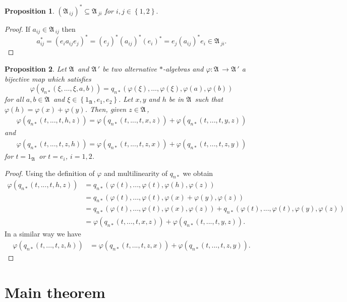 \documentclass{amsart}
\newtheorem{proposition}{Proposition}[section]
\def\A{{\mathfrak A}\, }
\begin{document}
\begin{proposition}\label{obs}
$(\A_{ij})^* \subseteq \A_{ji}$ for $i,j \in \left\{1,2\right\}.$
\end{proposition}
\begin{proof}
If $a_{ij} \in \A_{ij}$ then $$a^*_{ij} = (e_i a_{ij} e_j)^* = (e_j)^*(a_{ij})^* (e_i)^* = e_j (a_{ij})^* e_i \in \A_{ji}.$$
\end{proof}
\begin{proposition}\label{Claim2} Let $\A$ and $\A'$ be two alternative $*$-algebras and $\varphi: \A \rightarrow \A'$ a bijective map which satisfies
\[
\varphi(q_{n*}(\xi, \ldots,\xi, a,b)) = q_{n*}(\varphi(\xi),\ldots,\varphi(\xi),\varphi(a),\varphi(b))
\]
for all $a, b \in \A$ and $\xi \in \left\{1_{\A}, e_1, e_2\right\}$. Let $x,y$ and $h$ be in $\A$ such that $\varphi(h) = \varphi(x) + \varphi(y)$. Then,
 given $z \in \A$,
$$
\begin{aligned}
\varphi(q_{n*}(t,...,t,h,z)) = \varphi(q_{n*}(t,...,t,x,z)) + \varphi(q_{n*}(t,...,t,y,z))
\end{aligned}
$$
and
$$
\begin{aligned}
\varphi(q_{n*}(t,...,t,z,h)) = \varphi(q_{n*}(t,...,t,z,x)) + \varphi(q_{n*}(t,...,t,z,y))
\end{aligned}
$$
for $t = 1_\A$ or $t = e_i$, $i = 1,2$.

\end{proposition}

\begin{proof}
Using the definition of $\varphi$ and multilinearity of $q_{n*}$ we obtain
$$
\begin{aligned}
\varphi(q_{n*}(t,...,t,h,z)) &= q_{n*}(\varphi(t),...,\varphi(t),\varphi(h),\varphi(z)) \\
&= q_{n*}(\varphi(t),...,\varphi(t),\varphi(x)+\varphi(y),\varphi(z)) \\
&= q_{n*}(\varphi(t),...,\varphi(t),\varphi(x),\varphi(z)) + q_{n*}(\varphi(t),...,\varphi(t),\varphi(y),\varphi(z)) \\
&= \varphi(q_{n*}(t,...,t,x,z)) + \varphi(q_{n*}(t,...,t,y,z)).
\end{aligned}
$$
In a similar way we have
$$
\begin{aligned}
\varphi(q_{n*}(t,...,t,z,h)) &= \varphi(q_{n*}(t,...,t,z,x)) + \varphi(q_{n*}(t,...,t,z,y)).
\end{aligned}
$$


\end{proof}


\section{Main theorem}
\end{document}

